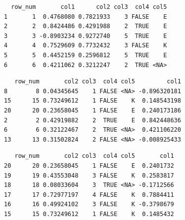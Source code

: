 \documentclass[
  letterpaper,
  DIV=11,
  numbers=noendperiod]{scrreprt}
\newenvironment{Shaded}{\begin{snugshade}}{\end{snugshade}}
\newcommand{\CommentTok}[1]{\textcolor[rgb]{0.37,0.37,0.37}{#1}}
\newcommand{\FunctionTok}[1]{\textcolor[rgb]{0.28,0.35,0.67}{#1}}
\newcommand{\NormalTok}[1]{\textcolor[rgb]{0.00,0.23,0.31}{#1}}
\newcommand{\SpecialCharTok}[1]{\textcolor[rgb]{0.37,0.37,0.37}{#1}}
\begin{document}
\begin{verbatim}
  row_num       col1      col2 col3  col4 col5
1       1  0.4768080 0.7821933    3 FALSE    E
2       2  0.8424486 0.4291988    2  TRUE    E
3       3 -0.8903234 0.9272740    5  TRUE    E
4       4  0.7529609 0.7732432    3 FALSE    K
5       5  0.4452159 0.2596812    5  TRUE    E
6       6  0.4211062 0.3212247    2  TRUE <NA>
\end{verbatim}

\begin{Shaded}
\end{Shaded}

\begin{verbatim}
   row_num       col2 col3  col4 col5         col1
8        8 0.04345645    1 FALSE <NA> -0.896320181
15      15 0.73249612    1 FALSE    K  0.148543198
20      20 0.23658045    1 FALSE    E  0.240173186
2        2 0.42919882    2  TRUE    E  0.842448636
6        6 0.32122467    2  TRUE <NA>  0.421106220
13      13 0.31502824    2 FALSE <NA> -0.008925433
\end{verbatim}

\begin{Shaded}
\end{Shaded}

\begin{verbatim}
   row_num       col2 col3  col4 col5       col1
20      20 0.23658045    1 FALSE    E  0.2401732
19      19 0.43553048    3 FALSE    K  0.2583817
18      18 0.08033604    3  TRUE <NA> -0.1712566
17      17 0.72977197    4 FALSE    K  0.7884411
16      16 0.49924102    3 FALSE    K -0.3798679
15      15 0.73249612    1 FALSE    K  0.1485432
\end{verbatim}

\begin{Shaded}
\end{Shaded}
\end{document}
